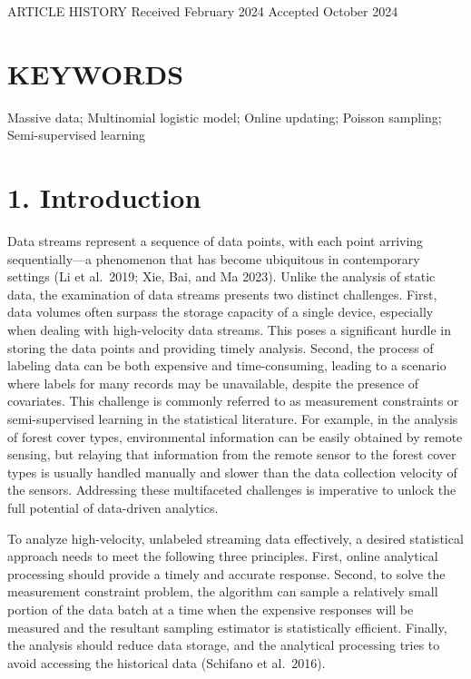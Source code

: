 \documentclass[
  10
]{article}
\begin{document}
ARTICLE HISTORY Received February 2024 Accepted October 2024

\section{KEYWORDS}\label{keywords}

Massive data; Multinomial logistic model; Online updating; Poisson
sampling; Semi-supervised learning

\section{1. Introduction}\label{introduction}

Data streams represent a sequence of data points, with each point
arriving sequentially---a phenomenon that has become ubiquitous in
contemporary settings (Li et al.~2019; Xie, Bai, and Ma 2023). Unlike
the analysis of static data, the examination of data streams presents
two distinct challenges. First, data volumes often surpass the storage
capacity of a single device, especially when dealing with high-velocity
data streams. This poses a significant hurdle in storing the data points
and providing timely analysis. Second, the process of labeling data can
be both expensive and time-consuming, leading to a scenario where labels
for many records may be unavailable, despite the presence of covariates.
This challenge is commonly referred to as measurement constraints or
semi-supervised learning in the statistical literature. For example, in
the analysis of forest cover types, environmental information can be
easily obtained by remote sensing, but relaying that information from
the remote sensor to the forest cover types is usually handled manually
and slower than the data collection velocity of the sensors. Addressing
these multifaceted challenges is imperative to unlock the full potential
of data-driven analytics.

To analyze high-velocity, unlabeled streaming data effectively, a
desired statistical approach needs to meet the following three
principles. First, online analytical processing should provide a timely
and accurate response. Second, to solve the measurement constraint
problem, the algorithm can sample a relatively small portion of the data
batch at a time when the expensive responses will be measured and the
resultant sampling estimator is statistically efficient. Finally, the
analysis should reduce data storage, and the analytical processing tries
to avoid accessing the historical data (Schifano et al.~2016).
\end{document}
